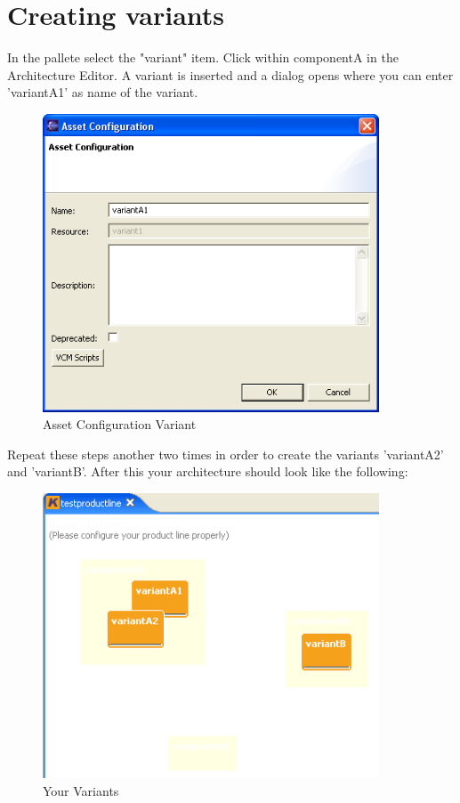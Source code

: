 \section{Creating variants}

In the pallete select the "variant" item. Click within componentA in 
the Architecture Editor. A variant is inserted and a dialog opens where you can enter 'variantA1' as name of
the variant. 

\begin{figure}[h!]
\begin{center}
\includegraphics[width=10cm]{tutorial9.png}
   \caption{Asset Configuration Variant}
\end{center}
\end{figure}\par

Repeat these steps another two times in order to create the variants 'variantA2' and 'variantB'.
After this your architecture should look like the following:

\begin{figure}[h!]
\begin{center}
\includegraphics[width=10cm]{tutorial10.png}
   \caption{Your Variants}
\end{center}
\end{figure}\par


